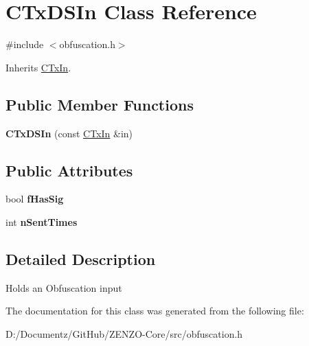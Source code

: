 \hypertarget{class_c_tx_d_s_in}{}\section{C\+Tx\+D\+S\+In Class Reference}
\label{class_c_tx_d_s_in}


{\ttfamily \#include $<$obfuscation.\+h$>$}



Inherits \mbox{\hyperlink{class_c_tx_in}{C\+Tx\+In}}.

\subsection*{Public Member Functions}
\begin{DoxyCompactItemize}
\item 
\mbox{\label{class_c_tx_d_s_in_a20abf35067e286483bbdf59dc5e611a9}} 
{\bfseries C\+Tx\+D\+S\+In} (const \mbox{\hyperlink{class_c_tx_in}{C\+Tx\+In}} \&in)
\end{DoxyCompactItemize}
\subsection*{Public Attributes}
\begin{DoxyCompactItemize}
\item 
\mbox{\label{class_c_tx_d_s_in_a8d19a02eab96dcb39bed5a4942f996d8}} 
bool {\bfseries f\+Has\+Sig}
\item 
\mbox{\label{class_c_tx_d_s_in_ad3da7f430f5bd835b02addff54a19606}} 
int {\bfseries n\+Sent\+Times}
\end{DoxyCompactItemize}


\subsection{Detailed Description}
Holds an Obfuscation input 

The documentation for this class was generated from the following file\+:\begin{DoxyCompactItemize}
\item 
D\+:/\+Documentz/\+Git\+Hub/\+Z\+E\+N\+Z\+O-\/\+Core/src/obfuscation.\+h\end{DoxyCompactItemize}
